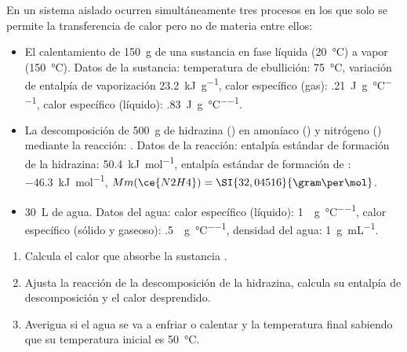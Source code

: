 En un sistema aislado ocurren simultáneamente tres procesos en los que solo se permite la transferencia de calor pero no de materia entre ellos:
\begin{itemize}
	\item El calentamiento de \SI{150}{\gram} de una sustancia  en fase líquida (\SI{20}{\celsius}) a vapor (\SI{150}{\celsius}). Datos de la sustancia: temperatura de ebullición: \SI{75}{\celsius}, variación de entalpía de vaporización \SI{23,2}{\kilo\joule\per\gram}, calor específico (gas): \SI{,21}{\joule\per\gram\per\celsius}, calor específico (líquido): \SI{,83}{\joule\per\gram\per\celsius}.
	\item La descomposición de \SI{500}{\gram} de hidrazina () en amoníaco () y nitrógeno () mediante la reacción: . Datos de la reacción: entalpía estándar de formación de la hidrazina: \SI{50,4}{\kilo\joule\per\mol}, entalpía estándar de formación de : \SI{-46,3}{\kilo\joule\per\mol}, $Mm(\ce{N2H4}) = \SI{32,04516}{\gram\per\mol}$.
	\item \SI{30}{\liter} de agua. Datos del agua: calor específico (líquido): \SI{1}{\calorie\per\gram\per\celsius}, calor específico (sólido y gaseoso): \SI{,5}{\calorie\per\gram\per\celsius}, densidad del agua: \SI{1}{\gram\per\milli\liter}.
\end{itemize}
\begin{enumerate}[label={\alph*)},font=\bfseries]
	\item Calcula el calor que absorbe la sustancia .
	\item Ajusta la reacción de la descomposición de la hidrazina, calcula su entalpía de descomposición y el calor desprendido.
	\item Averigua si el agua se va a enfriar o calentar y la temperatura final sabiendo que su temperatura inicial es \SI{50}{\celsius}.
\end{enumerate}

